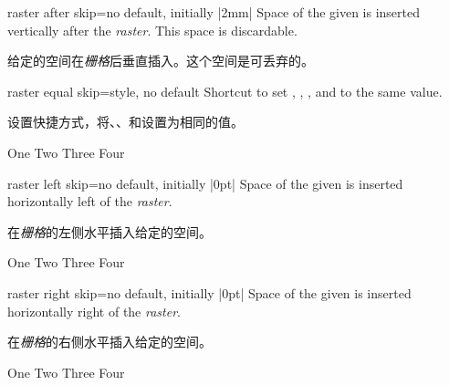 \begin{docTcbKey}[][doc new and updated={2014-11-10}{2014-12-16}]{raster after skip}{=}{no default, initially |2mm|}
Space of the given  is inserted vertically after the \emph{raster}.
This space is discardable.

给定的空间在\emph{栅格}后垂直插入。这个空间是可丢弃的。
\end{docTcbKey}


\begin{docTcbKey}[][doc new=2015-01-08]{raster equal skip}{=}{style, no default}
Shortcut to set
,
,
, and
to the same  value.

设置快捷方式，将、、和设置为相同的值。
\begin{dispExample}
\begin{tcbitemize}[raster equal skip=4mm,
size=small,colframe=red!50!black,colback=red!10!white]
\tcbitem One
\tcbitem Two
\tcbitem Three
\tcbitem Four
\end{tcbitemize}
\end{dispExample}
\end{docTcbKey}



\begin{docTcbKey}[][doc new=2014-11-10]{raster left skip}{=}{no default, initially |0pt|}
Space of the given  is inserted horizontally left of the \emph{raster}.

在\emph{栅格}的左侧水平插入给定的空间。
\begin{dispExample}
\begin{tcbitemize}[raster left skip=2cm,
size=small,colframe=red!50!black,colback=red!10!white]
\tcbitem One
\tcbitem Two
\tcbitem Three
\tcbitem Four
\end{tcbitemize}
\end{dispExample}
\end{docTcbKey}


\begin{docTcbKey}[][doc new=2014-11-10]{raster right skip}{=}{no default, initially |0pt|}
Space of the given  is inserted horizontally right of the \emph{raster}.

在\emph{栅格}的右侧水平插入给定的空间。
\begin{dispExample}
\begin{tcbitemize}[raster right skip=2cm,
size=small,colframe=red!50!black,colback=red!10!white]
\tcbitem One
\tcbitem Two
\tcbitem Three
\tcbitem Four
\end{tcbitemize}
\end{dispExample}
\end{docTcbKey}

